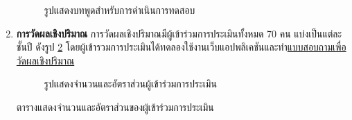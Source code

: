 \begin{enumerate}
\begin{figure}[H]
              \caption{รูปแสดงบทพูดสำหรับการดำเนินการทดสอบ}\label{fig:ScriptUT}
          \end{figure}
    \item \textbf{การวัดผลเชิงปริมาณ} การวัดผลเชิงปริมาณมีผู้เข้าร่วมการประเมินทั้งหมด 70 คน แบ่งเป็นแต่ละชั้นปี ดังรูป \ref{fig:UserRatio}  โดยผู้เข้ารวมการประเมินได้ทดลองใช้งานเว็บแอปพลิเคชันและทำ\href{https://forms.office.com/r/CRHVxtCC4t}{แบบสอบถามเพื่อวัดผลเชิงปริมาณ}
    \begin{figure}[H]\centering
        \caption{รูปแสดงจำนวนและอัตราส่วนผู้เข้าร่วมการประเมิน}\label{fig:UserRatio}
    \end{figure}
    \begin{table}[H]
            \caption{ตารางแสดงจำนวนและอัตราส่วนของผู้เข้าร่วมการประเมิน}

\end{table}
\end{enumerate}
